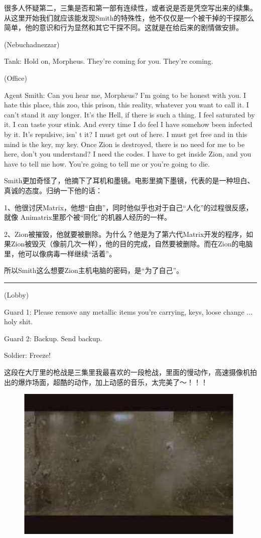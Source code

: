 \documentclass{ctexart}
\newcommand{\myparsep}{\noindent \rule[0.5ex]{\linewidth}{1pt}}
\newenvironment{myquote}{\color{green} \setlength{\leftskip}{6em} \setlength{\rightskip}{4em} \setlength{\parindent}{-2em}}{\par}
\begin{document}
很多人怀疑第二，三集是否和第一部有连续性，或者说是否是凭空写出来的续集。从这里开始我们就应该能发现Smith的特殊性，他不仅仅是一个被干掉的干探那么简单，他的意识和行为显然和其它干探不同。这就是在给后来的剧情做安排。

\begin{myquote}
(Nebuchadnezzar)

Tank: Hold on, Morpheus. They're coming for you. They're coming.

(Office)

Agent Smith: Can you hear me, Morpheus? I'm going to be honest with you. I hate this place, this zoo, this prison, this reality, whatever you want to call it. I can't stand it any longer. It's the Hell, if there is such a thing. I feel saturated by it. I can taste your stink. And every time I do feel I have somehow been infected by it. It's repulsive, isn' t it? I must get out of here. I must get free and in this mind is the key, my key. Once Zion is destroyed, there is no need for me to be here, don't you understand? I need the codes. I have to get inside Zion, and you have to tell me how. You're going to tell me or you're going to die.
\end{myquote}

Smith更加奇怪了，他摘下了耳机和墨镜。电影里摘下墨镜，代表的是一种坦白、真诚的态度。归纳一下他的话：

1、他很讨厌Matrix，他想“自由”，同时他似乎也对于自己“人化”的过程很反感，就像 Animatrix里那个被“同化”的机器人经历的一样。

2、Zion被摧毁，他就要被删除。为什么？他是为了第六代Matrix开发的程序，如果Zion被毁灭（像前几次一样），他的目的完成，自然要被删除。而在Zion的电脑里，他可以像病毒一样继续“活着”。

所以Smith这么想要Zion主机电脑的密码，是“为了自己”。

\myparsep

\begin{myquote}
(Lobby)

Guard 1: Please remove any metallic items you're carrying, keys, loose change ... holy shit.

Guard 2: Backup. Send backup.

Soldier: Freeze!
\end{myquote}

这段在大厅里的枪战是三集里我最喜欢的一段枪战，里面的慢动作，高速摄像机拍出的爆炸场面，超酷的动作，加上动感的音乐，太完美了～！！！

\begin{figure}[htb]
\centering
\includegraphics[width=0.5\linewidth]{fig/read_Matrix-63}
\end{figure}
\end{document}
